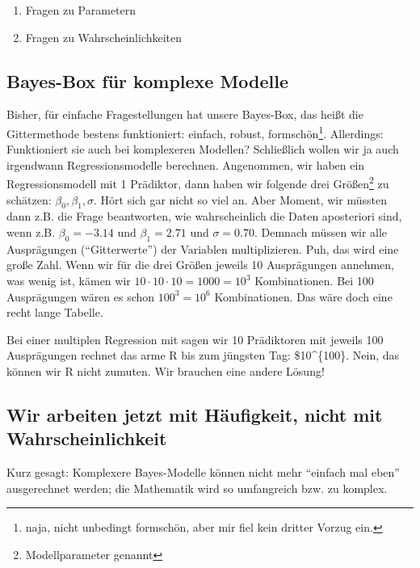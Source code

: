 \documentclass[
  a4paper,
  DIV=11]{scrreprt}
\providecommand{\tightlist}{%
  \setlength{\itemsep}{0pt}\setlength{\parskip}{0pt}}\usepackage{longtable,booktabs,array}
\theoremstyle{definition}
\theoremstyle{remark}
\begin{document}
\begin{enumerate}
\def\labelenumi{\arabic{enumi}.}
\tightlist
\item
  Fragen zu Parametern
\item
  Fragen zu Wahrscheinlichkeiten
\end{enumerate}

\hypertarget{bayes-box-fuxfcr-komplexe-modelle}{%
\subsection{Bayes-Box für komplexe
Modelle}\label{bayes-box-fuxfcr-komplexe-modelle}}

Bisher, für einfache Fragestellungen hat unsere Bayes-Box, das heißt die
Gittermethode bestens funktioniert: einfach, robust,
formschön\footnote{naja, nicht unbedingt formschön, aber mir fiel kein
  dritter Vorzug ein.}. Allerdings: Funktioniert sie auch bei
komplexeren Modellen? Schließlich wollen wir ja auch irgendwann
Regressionsmodelle berechnen. Angenommen, wir haben ein
Regressionsmodell mit 1 Prädiktor, dann haben wir folgende drei
Größen\footnote{Modellparameter genannt} zu schätzen:
\(\beta_0, \beta_1, \sigma\). Hört sich gar nicht so viel an. Aber
Moment, wir müssten dann z.B. die Frage beantworten, wie wahrscheinlich
die Daten aposteriori sind, wenn z.B. \(\beta_0 = -3.14\) und
\(\beta_1 = 2.71\) und \(\sigma = 0.70\). Demnach müssen wir alle
Ausprägungen (``Gitterwerte'') der Variablen multiplizieren. Puh, das
wird eine große Zahl. Wenn wir für die drei Größen jeweils 10
Ausprägungen annehmen, was wenig ist, kämen wir
\(10\cdot10\cdot10= 1000=10^3\) Kombinationen. Bei 100 Ausprägungen
wären es schon \(100^3=10^6\) Kombinationen. Das wäre doch eine recht
lange Tabelle.

Bei einer multiplen Regression mit sagen wir 10 Prädiktoren mit jeweils
100 Ausprägungen rechnet das arme R bis zum jüngsten Tag:
\$10\^{}\{100\}. Nein, das können wir R nicht zumuten. Wir brauchen eine
andere Lösung!

\hypertarget{wir-arbeiten-jetzt-mit-huxe4ufigkeit-nicht-mit-wahrscheinlichkeit}{%
\subsection{Wir arbeiten jetzt mit Häufigkeit, nicht mit
Wahrscheinlichkeit}\label{wir-arbeiten-jetzt-mit-huxe4ufigkeit-nicht-mit-wahrscheinlichkeit}}

Kurz gesagt: Komplexere Bayes-Modelle können nicht mehr ``einfach mal
eben'' ausgerechnet werden; die Mathematik wird so umfangreich bzw. zu
komplex.
\end{document}
